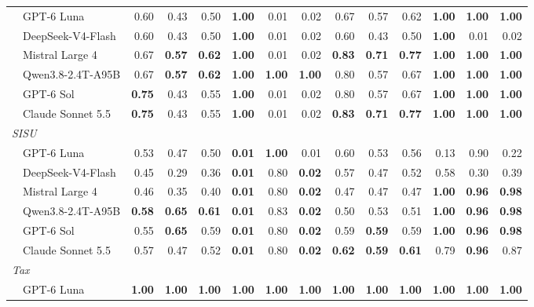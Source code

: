 \begin{table}[t]
\begin{tabular}{l@{\hspace{0.6em}}rrr@{\hspace{0.6em}}rrr@{\hspace{0.6em}}rrr@{\hspace{0.6em}}rrr}
  ~~GPT-6 Luna & 0.60 & 0.43 & 0.50 & \textbf{1.00} & 0.01 & 0.02 & 0.67 & 0.57 & 0.62 & \textbf{1.00} & \textbf{1.00} & \textbf{1.00} \\
  ~~DeepSeek-V4-Flash & 0.60 & 0.43 & 0.50 & \textbf{1.00} & 0.01 & 0.02 & 0.60 & 0.43 & 0.50 & \textbf{1.00} & 0.01 & 0.02 \\
  ~~Mistral Large 4 & 0.67 & \textbf{0.57} & \textbf{0.62} & \textbf{1.00} & 0.01 & 0.02 & \textbf{0.83} & \textbf{0.71} & \textbf{0.77} & \textbf{1.00} & \textbf{1.00} & \textbf{1.00} \\
  ~~Qwen3.8-2.4T-A95B & 0.67 & \textbf{0.57} & \textbf{0.62} & \textbf{1.00} & \textbf{1.00} & \textbf{1.00} & 0.80 & 0.57 & 0.67 & \textbf{1.00} & \textbf{1.00} & \textbf{1.00} \\
  ~~GPT-6 Sol & \textbf{0.75} & 0.43 & 0.55 & \textbf{1.00} & 0.01 & 0.02 & 0.80 & 0.57 & 0.67 & \textbf{1.00} & \textbf{1.00} & \textbf{1.00} \\
  ~~Claude Sonnet 5.5 & \textbf{0.75} & 0.43 & 0.55 & \textbf{1.00} & 0.01 & 0.02 & \textbf{0.83} & \textbf{0.71} & \textbf{0.77} & \textbf{1.00} & \textbf{1.00} & \textbf{1.00} \\
  \midrule
  \multicolumn{13}{l}{\textit{SISU}} \\
  ~~GPT-6 Luna & 0.53 & 0.47 & 0.50 & \textbf{0.01} & \textbf{1.00} & 0.01 & 0.60 & 0.53 & 0.56 & 0.13 & 0.90 & 0.22 \\
  ~~DeepSeek-V4-Flash & 0.45 & 0.29 & 0.36 & \textbf{0.01} & 0.80 & \textbf{0.02} & 0.57 & 0.47 & 0.52 & 0.58 & 0.30 & 0.39 \\
  ~~Mistral Large 4 & 0.46 & 0.35 & 0.40 & \textbf{0.01} & 0.80 & \textbf{0.02} & 0.47 & 0.47 & 0.47 & \textbf{1.00} & \textbf{0.96} & \textbf{0.98} \\
  ~~Qwen3.8-2.4T-A95B & \textbf{0.58} & \textbf{0.65} & \textbf{0.61} & \textbf{0.01} & 0.83 & \textbf{0.02} & 0.50 & 0.53 & 0.51 & \textbf{1.00} & \textbf{0.96} & \textbf{0.98} \\
  ~~GPT-6 Sol & 0.55 & \textbf{0.65} & 0.59 & \textbf{0.01} & 0.80 & \textbf{0.02} & 0.59 & \textbf{0.59} & 0.59 & \textbf{1.00} & \textbf{0.96} & \textbf{0.98} \\
  ~~Claude Sonnet 5.5 & 0.57 & 0.47 & 0.52 & \textbf{0.01} & 0.80 & \textbf{0.02} & \textbf{0.62} & \textbf{0.59} & \textbf{0.61} & 0.79 & \textbf{0.96} & 0.87 \\
  \midrule
  \multicolumn{13}{l}{\textit{Tax}} \\
  ~~GPT-6 Luna & \textbf{1.00} & \textbf{1.00} & \textbf{1.00} & \textbf{1.00} & \textbf{1.00} & \textbf{1.00} & \textbf{1.00} & \textbf{1.00} & \textbf{1.00} & \textbf{1.00} & \textbf{1.00} & \textbf{1.00} \\

\end{tabular}
\end{table}
